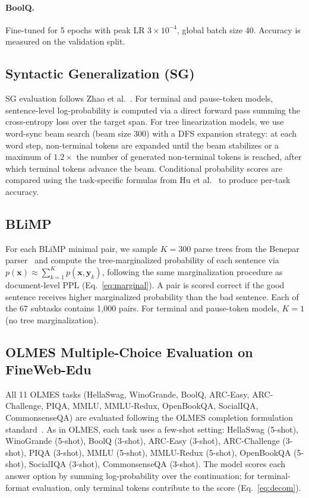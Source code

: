 \documentclass[11pt]{article}
\begin{document}
\paragraph{BoolQ.} Fine-tuned for 5 epochs with peak LR $3\times10^{-4}$, global batch size 40.
Accuracy is measured on the validation split.

\subsection{Syntactic Generalization (SG)}
SG evaluation follows Zhao et al.~\cite{zhao-etal-2025-systematic}.
For terminal and pause-token models, sentence-level log-probability is computed via a direct forward pass summing the cross-entropy loss over the target span.
For tree linearization models, we use word-sync beam search (beam size 300) with a DFS expansion strategy: at each word step, non-terminal tokens are expanded until the beam stabilizes or a maximum of $1.2\times$ the number of generated non-terminal tokens is reached, after which terminal tokens advance the beam.
Conditional probability scores are compared using the task-specific formulas from Hu et al.~\cite{hu-etal-2020-systematic} to produce per-task accuracy.

\subsection{BLiMP}
For each BLiMP minimal pair, we sample $K=300$ parse trees from the Benepar parser~\cite{kitaev-klein-2018-constituency} and compute the tree-marginalized probability of each sentence via $p(\mathbf{x}) \approx \sum_{k=1}^{K} p(\mathbf{x}, \mathbf{y}_k)$, following the same marginalization procedure as document-level PPL (Eq.~\ref{eq:marginal}).
A pair is scored correct if the good sentence receives higher marginalized probability than the bad sentence.
Each of the 67 subtasks contains 1,000 pairs.
For terminal and pause-token models, $K=1$ (no tree marginalization).

\subsection{OLMES Multiple-Choice Evaluation on FineWeb-Edu}
All 11 OLMES tasks (HellaSwag, WinoGrande, BoolQ, ARC-Easy, ARC-Challenge, PIQA, MMLU, MMLU-Redux, OpenBookQA, SocialIQA, CommonsenseQA) are evaluated following the OLMES completion formulation standard~\cite{gu-etal-2025-olmes}. 
As in OLMES, each task uses a few-shot setting: HellaSwag (5-shot), WinoGrande (5-shot), BoolQ (3-shot), ARC-Easy (3-shot), ARC-Challenge (3-shot), PIQA (3-shot), MMLU (5-shot), MMLU-Redux (5-shot), OpenBookQA (5-shot), SocialIQA (3-shot), CommonsenseQA (3-shot).
The model scores each answer option by summing log-probability over the continuation; for terminal-format evaluation, only terminal tokens contribute to the score (Eq.~\ref{eq:decom}).
\end{document}
